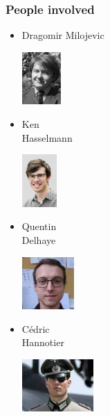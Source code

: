 \documentclass[11pt,a4paper,compress]{beamer}%
\begin{document}
\begin{frame}
\frametitle{People involved}
\begin{itemize}
\item Dragomir Milojevic\\
\begin{center}
\includegraphics[height=2cm]{figures/d.jpg}
\end{center}
\end{itemize}

\begin{minipage}[t]{0.3\linewidth}
\begin{itemize}
\item Ken\\ Hasselmann
\begin{center}
\includegraphics[height=2cm]{figures/k.jpg}
\end{center}
\end{itemize}
\end{minipage}
%
\begin{minipage}[t]{0.3\linewidth}
\begin{itemize}
\item Quentin\\ Delhaye
\begin{center}
\includegraphics[height=2cm]{figures/QD.jpg}
\end{center}
\vspace{2.3cm}
\end{itemize}
\end{minipage}
%
\begin{minipage}[t]{0.3\linewidth}
\begin{itemize}
\item Cédric\\ Hannotier
\begin{center}
\includegraphics[height=2cm]{figures/c.jpg}
\end{center}
\vspace{2.3cm}
\end{itemize}
\end{minipage}

\end{frame}
\end{document}
